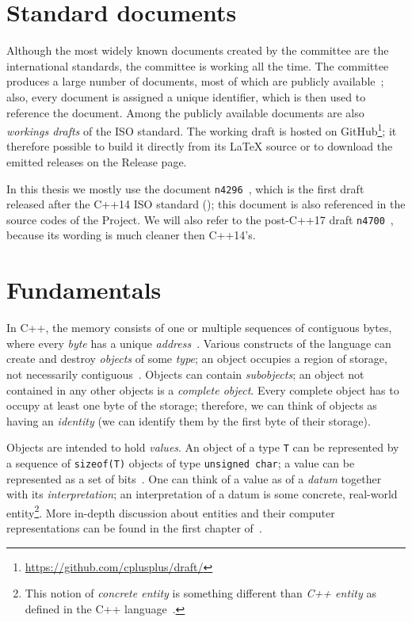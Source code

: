 \documentclass[nolot,nolof,nocover,printed]{fithesis3}
\newcommand{\Project}{Project\xspace}
\newcommand{\stdN}[2]{\cite[#2]{#1}\xspace}
\begin{document}
\section{Standard documents}
Although the most widely known documents created by the committee are the international standards, the committee is working all the time. The committee produces a large number of documents, most of which are publicly available~\cite{wg21papers}; also, every document is assigned a unique identifier, which is then used to reference the document. Among the publicly available documents are also \textit{workings drafts} of the ISO standard. The working draft is hosted on GitHub\footnote{\url{https://github.com/cplusplus/draft/}}; it therefore possible to build it directly from its \LaTeX{ }source or to download the emitted releases on the Release page.

In this thesis we mostly use the document \texttt{n4296}~\cite{n4296}, which is the first draft released after the C++14 ISO standard (\cite{ISOcpp14}); this document is also referenced in the source codes of the \Project. We will also refer to the post-C++17 draft \texttt{n4700}~\cite{n4296}, because its wording is much cleaner then C++14's.


\section{Fundamentals}


In C++, the memory consists of one or multiple sequences of contiguous bytes, where every \textit{byte} has a unique \textit{address}~\stdN{n4700}{\S 4.4/1}. Various constructs of the language can create and destroy \textit{objects} of some \textit{type}; an object occupies a region of storage, not necessarily contiguous~\stdN{n4700}{\S 4.5/1}. Objects can contain \textit{subobjects}; an object not contained in any other objects is a \textit{complete object}. Every complete object has to occupy at least one byte of the storage; therefore, we can think of objects as having an \textit{identity} (we can identify them by the first byte of their storage).

Objects are intended to hold \textit{values}. An object of a type \texttt{T} can be represented by a sequence of \lstinline|sizeof(T)| objects of type \lstinline|unsigned char|; a value can be represented as a set of bits~\stdN{n4296}{\S 3.9/4}.
One can think of a value as of a \textit{datum} together with its \textit{interpretation}; an interpretation of a datum is some concrete, real-world entity\footnote{This notion of \textit{concrete entity} is something different than \textit{C++ entity} as defined in the C++ language~\stdN{n4296}{\S 3/3}. }. 
More in-depth discussion about entities and their computer representations can be found in the first chapter of~\cite{progelements}.
\end{document}
